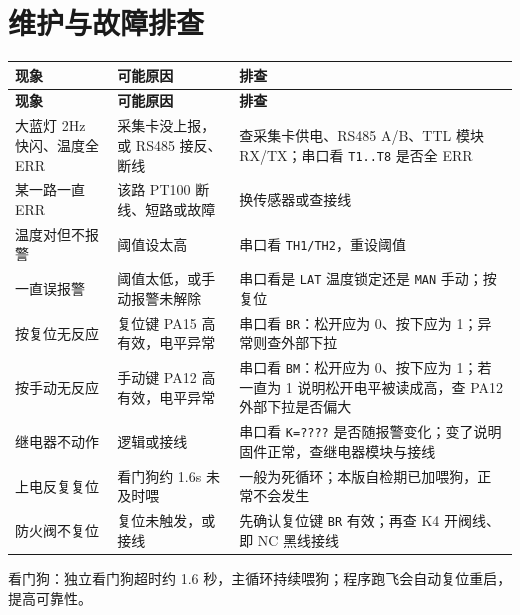 \documentclass[a4paper,11pt]{ctexart}
\newenvironment{notebox}[1][red!7]{%
  \def\noteboxcolor{#1}%
  \par\smallskip\noindent
  \begin{lrbox}{\noteboxsave}%
  \begin{minipage}{\dimexpr\linewidth-2\fboxsep-2\fboxrule\relax}\small\setlength{\parskip}{2pt}}%
  {\end{minipage}\end{lrbox}%
  \fcolorbox{black!35}{\noteboxcolor}{\usebox{\noteboxsave}}\par\smallskip}
\begin{document}
\section{维护与故障排查}
\renewcommand{\arraystretch}{1.25}
\begin{center}
\begin{longtable}{|L{3.6cm}|L{4.2cm}|L{6.0cm}|}
\hline
\textbf{现象} & \textbf{可能原因} & \textbf{排查}\\
\hline
\endfirsthead
\hline
\textbf{现象} & \textbf{可能原因} & \textbf{排查}\\
\hline
\endhead
大蓝灯 2Hz 快闪、温度全 ERR & 采集卡没上报，或 RS485 接反、断线 & 查采集卡供电、RS485 A/B、TTL 模块 RX/TX；串口看 \texttt{T1..T8} 是否全 ERR\\
\hline
某一路一直 ERR & 该路 PT100 断线、短路或故障 & 换传感器或查接线\\
\hline
温度对但不报警 & 阈值设太高 & 串口看 \texttt{TH1/TH2}，重设阈值\\
\hline
一直误报警 & 阈值太低，或手动报警未解除 & 串口看是 \texttt{LAT} 温度锁定还是 \texttt{MAN} 手动；按复位\\
\hline
按复位无反应 & 复位键 PA15 高有效，电平异常 & 串口看 \texttt{BR}：松开应为 0、按下应为 1；异常则查外部下拉\\
\hline
按手动无反应 & 手动键 PA12 高有效，电平异常 & 串口看 \texttt{BM}：松开应为 0、按下应为 1；若一直为 1 说明松开电平被读成高，查 PA12 外部下拉是否偏大\\
\hline
继电器不动作 & 逻辑或接线 & 串口看 \texttt{K=????} 是否随报警变化；变了说明固件正常，查继电器模块与接线\\
\hline
上电反复复位 & 看门狗约 1.6s 未及时喂 & 一般为死循环；本版自检期已加喂狗，正常不会发生\\
\hline
防火阀不复位 & 复位未触发，或接线 & 先确认复位键 \texttt{BR} 有效；再查 K4 开阀线、即 NC 黑线接线\\
\hline
\end{longtable}
\end{center}
\renewcommand{\arraystretch}{1.0}
\begin{notebox}[blue!6]
看门狗：独立看门狗超时约 1.6 秒，主循环持续喂狗；程序跑飞会自动复位重启，提高可靠性。
\end{notebox}

\end{document}
